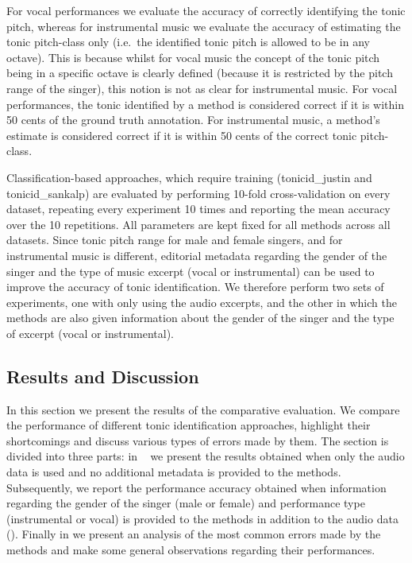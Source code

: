 {For vocal performances we evaluate the accuracy of correctly identifying the tonic pitch, whereas for instrumental music we evaluate the accuracy of estimating the tonic pitch-class only (i.e.~the identified tonic pitch is allowed to be in any octave). This is because whilst for vocal music the concept of the tonic pitch being in a specific octave is clearly defined (because it is restricted by the pitch range of the singer), this notion is not as clear for instrumental music. For vocal performances, the tonic identified by a method is considered correct if it is within 50 cents of the ground truth annotation. For instrumental music, a method's estimate is considered correct if it is within 50 cents of the correct tonic pitch-class.

Classification-based approaches, which require training (\acrshort{tonicid_justin} and \acrshort{tonicid_sankalp}) are evaluated by performing 10-fold cross-validation on every dataset, repeating
every experiment 10 times and reporting the mean accuracy over the 10 repetitions. All parameters are kept fixed for all methods across all datasets. Since tonic pitch range for male and female singers, and for instrumental music is different, editorial metadata regarding the gender of the singer and the type of music excerpt (vocal or instrumental) can be used to improve the accuracy of tonic identification. We therefore perform two sets of experiments, one with only using the audio excerpts, and the other in which the methods are also given information about the gender of the singer and the type of excerpt (vocal or instrumental). 

\subsection{Results and Discussion}
\label{sec:pre_processing_tonic_identification_results}

In this section we present the results of the comparative evaluation. We compare the performance of different tonic identification approaches, highlight their shortcomings and discuss various types of errors made by them. The section is divided into three parts: in ~ we present the results obtained when only the audio data is used and no additional metadata is provided to the methods. Subsequently, we report the performance accuracy
obtained when information regarding the gender of the singer (male or female) and performance type (instrumental or vocal) is provided to the methods in addition to the audio data (). Finally in  we present an analysis of the most common errors made by the methods and make some general observations regarding their performances.

}
